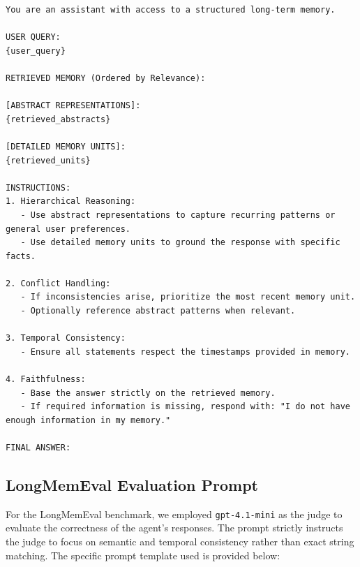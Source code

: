 \begin{lstlisting}[caption={Prompt for Reconstructive Synthesis (Answer Generation).}, label={lst:synthesis_prompt}]
You are an assistant with access to a structured long-term memory.

USER QUERY:
{user_query}

RETRIEVED MEMORY (Ordered by Relevance):

[ABSTRACT REPRESENTATIONS]:
{retrieved_abstracts}

[DETAILED MEMORY UNITS]:
{retrieved_units}

INSTRUCTIONS:
1. Hierarchical Reasoning:
   - Use abstract representations to capture recurring patterns or general user preferences.
   - Use detailed memory units to ground the response with specific facts.

2. Conflict Handling:
   - If inconsistencies arise, prioritize the most recent memory unit.
   - Optionally reference abstract patterns when relevant.

3. Temporal Consistency:
   - Ensure all statements respect the timestamps provided in memory.

4. Faithfulness:
   - Base the answer strictly on the retrieved memory.
   - If required information is missing, respond with: "I do not have enough information in my memory."

FINAL ANSWER:
\end{lstlisting}

\subsection{LongMemEval Evaluation Prompt}
\label{sec:longmemeval_prompt}

For the LongMemEval benchmark, we employed \texttt{gpt-4.1-mini} as the judge to evaluate the correctness of the agent's responses. The prompt strictly instructs the judge to focus on semantic and temporal consistency rather than exact string matching. The specific prompt template used is provided below:

